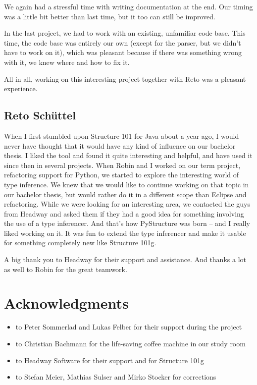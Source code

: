 \documentclass[12pt,halfparskip,DIV11,BCOR10mm]{scrreprt}
\begin{document}
We again had a stressful time with writing documentation at the end. Our timing was a little bit better than last time, but it too can still be improved.

In the last project, we had to work with an existing, unfamiliar code base. This time, the code base was entirely our own (except for the parser, but we didn't have to work on it), which was pleasant because if there was something wrong with it, we knew where and how to fix it.

All in all, working on this interesting project together with Reto was a pleasant experience.

\subsection{Reto Schüttel}

When I first stumbled upon Structure 101 for Java about a year ago, I would never have thought that it would have any kind of influence on our bachelor thesis. I liked the tool and found it quite interesting and helpful, and have used it since then in several projects. When Robin and I worked on our term project, refactoring support for Python, we started to explore the interesting world of type inference. We knew that we would like to continue working on that topic in our bachelor thesis, but would rather do it in a different scope than Eclipse and refactoring. While we were looking for an interesting area, we contacted the guys from Headway and asked them if they had a good idea for something involving the use of a type inferencer. And that's how PyStructure was born – and I really liked working on it. It was fun to extend the type inferencer and make it usable for something completely new like Structure 101g.

A big thank you to Headway for their support and assistance. And thanks a lot as well to Robin for the great teamwork.

\section{Acknowledgments}

\begin{itemize}
    \item to Peter Sommerlad and Lukas Felber for their support during the project
    \item to Christian Bachmann for the life-saving coffee machine in our study room
    \item to Headway Software for their support and for Structure 101g
    \item to Stefan Meier, Mathias Sulser and Mirko Stocker for corrections
\end{itemize}
\end{document}
